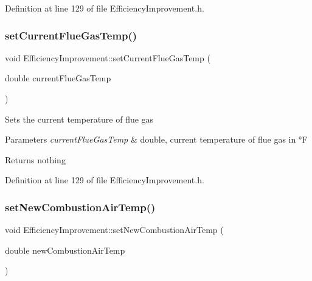 Definition at line 129 of file Efficiency\+Improvement.\+h.

\mbox{\label{class_efficiency_improvement_aef6ffeae5135982ef223ce4a5efe23d8}} 
\subsubsection{\texorpdfstring{set\+Current\+Flue\+Gas\+Temp()}{setCurrentFlueGasTemp()}\hspace{0.1cm}{\footnotesize\ttfamily [3/3]}}
{\footnotesize\ttfamily void Efficiency\+Improvement\+::set\+Current\+Flue\+Gas\+Temp (\begin{DoxyParamCaption}\item[{double}]{current\+Flue\+Gas\+Temp }\end{DoxyParamCaption})\hspace{0.3cm}{\ttfamily [inline]}}

Sets the current temperature of flue gas


\begin{DoxyParams}{Parameters}
{\em current\+Flue\+Gas\+Temp} & double, current temperature of flue gas in °F\\
\hline
\end{DoxyParams}
\begin{DoxyReturn}{Returns}
nothing 
\end{DoxyReturn}


Definition at line 129 of file Efficiency\+Improvement.\+h.

\mbox{\label{class_efficiency_improvement_a93705877dfad913c6282fbd31e66c41a}} 
\subsubsection{\texorpdfstring{set\+New\+Combustion\+Air\+Temp()}{setNewCombustionAirTemp()}\hspace{0.1cm}{\footnotesize\ttfamily [1/3]}}
{\footnotesize\ttfamily void Efficiency\+Improvement\+::set\+New\+Combustion\+Air\+Temp (\begin{DoxyParamCaption}\item[{double}]{new\+Combustion\+Air\+Temp }\end{DoxyParamCaption})\hspace{0.3cm}{\ttfamily [inline]}}

